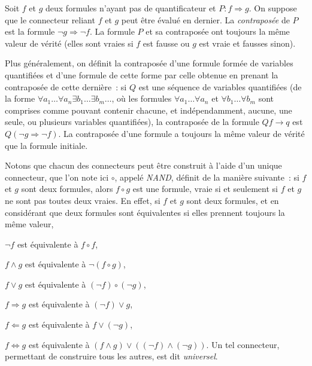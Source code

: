 \stopsubsection


\startsubsection[title=Contraposée]

Soit $f$ et $g$ deux formules n'ayant pas de quantificateur et $P: f \Rightarrow g$. 
On suppose que le connecteur reliant $f$ et $g$ peut être évalué en dernier.
La \emph{contraposée} de $P$ est la formule $\lnot g \Rightarrow \lnot f$. 
La formule $P$ et sa contraposée ont toujours la même valeur de vérité (elles sont vraies si $f$ est fausse ou $g$ est vraie et fausses sinon). 

Plus généralement, on définit la contraposée d'une formule formée de variables quantifiées et d'une formule de cette forme par celle obtenue en prenant la contraposée de cette dernière : si $Q$ est une séquence de variables quantifiées (de la forme $\forall a_1 \dots \forall a_n \exists b_1 \dots \exists b_m \dots$, où les formules $\forall a_1 \dots \forall a_n$ et $\forall b_1 \dots \forall b_m$ sont comprises comme pouvant contenir chacune, et indépendamment, aucune, une seule, ou plusieurs variables quantifiées), la contraposée de la formule $Q f \rightarrow q$ est $Q (\lnot g \Rightarrow \lnot f)$. 
La contraposée d'une formule a toujours la même valeur de vérité que la formule initiale.

\stopsubsection


\startsubsection[title=NAND et NOR]

Notons que chacun des connecteurs peut être construit à l'aide d'un unique connecteur, que l'on note ici $\circ$, appelé \emph{NAND}, définit de la manière suivante : si $f$ et $g$ sont deux formules, alors $f \circ g$ est une formule, vraie si et seulement si $f$ et $g$ ne sont pas toutes deux vraies. 
En effet, si $f$ et $g$ sont deux formules, et en considérant que deux formules sont équivalentes si elles prennent toujours la même valeur,
\startitemize
  \item $\lnot f$ est équivalente à $f \circ f$,
  \item $f \wedge g$ est équivalente à $\lnot (f \circ g)$,
  \item $f \vee g$ est équivalente à $(\lnot f) \circ (\lnot g)$,
  \item $f \Rightarrow g$ est équivalente à $(\lnot f) \vee g$,
  \item $f \Leftarrow g$ est équivalente à $f \vee (\lnot g)$,
  \item $f \Leftrightarrow g$ est équivalente à $(f \wedge g) \vee ((\lnot f) \wedge (\lnot g))$.
\stopitemize
Un tel connecteur, permettant de construire tous les autres, est dit \emph{universel}.

